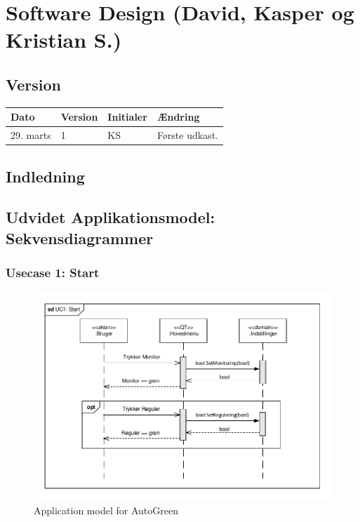 \chapter{Software Design (David, Kasper og Kristian S.)}

\section{Version}
\begin{table}[h]
	\centering
	\begin{tabularx}{\textwidth - 2cm}{|l|l|l|X|}
	\hline
	Dato	& Version	& Initialer & Ændring	\\ \hline
	29. marts & 1 & KS & Første udkast. \\ \hline 
	\end{tabularx}
\end{table}

\section{Indledning}

\section{Udvidet Applikationsmodel: Sekvensdiagrammer}

\subsection{Usecase 1: Start}

\begin{figure}[!h]
\centering 
\includegraphics[width={\textwidth-1cm}, trim=0 0 0 0, clip=true] {../fig/SD_autoGreen_UC_1_Start.pdf}
\caption{Application model for AutoGreen}
\label{fig:SD_UC1}
\end{figure}

